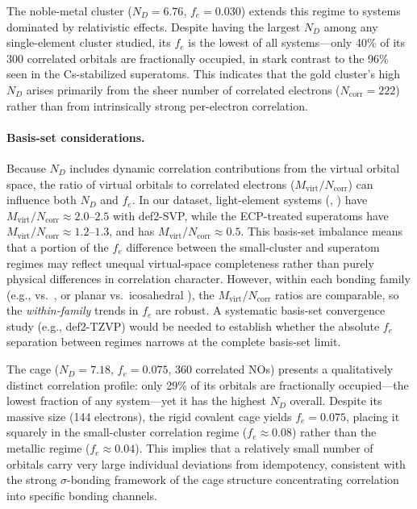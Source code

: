 \documentclass[12pt,a4paper]{article}
\begin{document}
The noble-metal cluster  ($N_D = 6.76$, $f_e = 0.030$)
extends this regime to systems dominated by relativistic effects.
Despite having the largest $N_D$ among any single-element cluster
studied, its $f_e$ is the lowest of all systems---only 40\% of its 300
correlated orbitals are fractionally occupied, in stark contrast to the 96\%
seen in the Cs-stabilized superatoms. This indicates that the gold cluster's
high $N_D$ arises primarily from the sheer number of correlated electrons
($N_{\text{corr}} = 222$) rather than from intrinsically strong per-electron
correlation.

\paragraph{Basis-set considerations.}
Because $N_D$ includes dynamic correlation contributions from
the virtual orbital space, the ratio of virtual orbitals to correlated
electrons ($M_{\text{virt}}/N_{\text{corr}}$) can influence both $N_D$
and $f_e$. In our dataset, light-element systems (, )
have $M_{\text{virt}}/N_{\text{corr}} \approx 2.0$--$2.5$ with def2-SVP,
while the ECP-treated superatoms have
$M_{\text{virt}}/N_{\text{corr}} \approx 1.2$--$1.3$, and
 has $M_{\text{virt}}/N_{\text{corr}} \approx 0.5$.
This basis-set imbalance means that a portion of the
$f_e$ difference between the small-cluster and superatom regimes may
reflect unequal virtual-space completeness rather than purely physical
differences in correlation character.
However, within each bonding family (e.g.,  vs.\
, or planar vs.\ icosahedral ), the
$M_{\text{virt}}/N_{\text{corr}}$ ratios are comparable,
so the \emph{within-family} trends in $f_e$ are robust.
A systematic basis-set convergence study (e.g., def2-TZVP)
would be needed to establish whether the absolute $f_e$ separation
between regimes narrows at the complete basis-set limit.

The  cage ($N_D = 7.18$, $f_e = 0.075$, 360 correlated NOs)
presents a qualitatively distinct correlation profile: only 29\% of its
orbitals are fractionally occupied---the lowest fraction of any system---yet
it has the highest $N_D$ overall. Despite its massive size (144 electrons),
the rigid covalent cage yields $f_e = 0.075$, placing it squarely in the
small-cluster correlation regime ($f_e \approx 0.08$) rather than the
metallic regime ($f_e \approx 0.04$). This implies that a relatively small
number of orbitals carry very large individual deviations from idempotency,
consistent with the strong $\sigma$-bonding framework of the cage structure
concentrating correlation into specific bonding channels.
\end{document}
